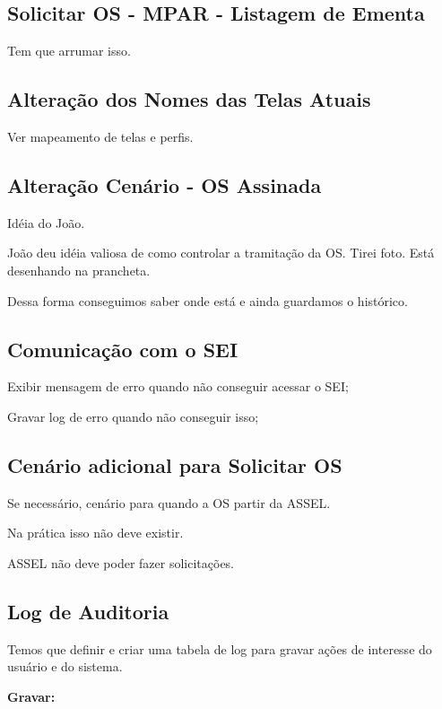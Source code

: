 \subsection{Solicitar OS - MPAR - Listagem de Ementa}

Tem que arrumar isso.

\subsection{Alteração dos Nomes das Telas Atuais}

Ver mapeamento de telas e perfis.



\subsection{Alteração Cenário - OS Assinada}


Idéia do João.

João deu idéia valiosa de como controlar a tramitação da OS. Tirei foto. Está desenhando na prancheta.

Dessa forma conseguimos saber onde está e ainda guardamos o histórico.


\subsection{Comunicação com o SEI}

Exibir mensagem de erro quando não conseguir acessar o SEI;

Gravar log de erro quando não conseguir isso;



\subsection{Cenário adicional para Solicitar OS}

Se necessário, cenário para quando a OS partir da ASSEL.

Na prática isso não deve existir.

ASSEL não deve poder fazer solicitações.


\subsection{Log de Auditoria}

Temos que definir e criar uma tabela de log para gravar ações de interesse do usuário e do sistema. 

\textbf{Gravar:}

